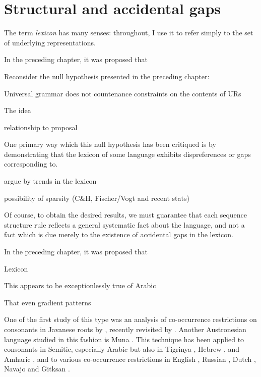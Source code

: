 \chapter{Structural and accidental gaps\protect{}}
\label{clusters}

The term \emph{lexicon} has many senses: throughout, I use it to refer simply to the set of underlying representations.

In the preceding chapter, it was proposed that 

Reconsider the null hypothesis presented in the preceding chapter:

\begin{example}
Universal grammar does not countenance constraints on the contents of URs
\end{example}

The idea 

relationship to proposal

One primary way which this null hypothesis has been critiqued is by demonstrating that the lexicon of some language 
exhibits dispreferences or gaps corresponding to.

argue by trends in the lexicon

possibility of sparsity (C\&H, Fischer/Vogt and recent stats)

Of course, to obtain the desired results, we must guarantee that each sequence structure rule reflects a general systematic fact about the language, and not a fact which is due merely to the existence of accidental gaps in the lexicon. \citep[][401, fn.~8]{Stanley1967}

In the preceding chapter, it was proposed that 

Lexicon

This appears to be exceptionlessly true of Arabic

That even gradient patterns 

One of the first study of this type was an analysis of co-occurrence restrictions on consonants in Javanese roots by \citet{Mester1988}, recently revisited by \citet{Graff2011}. 
Another Austronesian language studied in this fashion is Muna \citep{Coetzee2008a,Anttila2008}.
This technique has been applied to consonants in Semitic, especially Arabic \citep{McCarthy1988,McCarthy1994,Pierrehumbert1993,Frisch1996,Frisch2004,Coetzee2008a} but also in Tigrinya \citep{Buckley1997}, Hebrew \citep{Berent2003}, and Amharic \citep{Colavin2010}, and to various co-occurrence restrictions in English \citep{Berkley1994b,Berkley1994a,Pierrehumbert1994,Dmitrieva2008a,Dmitrieva2008b,Coetzee2008b}, Russian \citep{Padgett1992}, Dutch \citep{Graff2011}, Navajo \citep{Martin2007,Martin2011} and Gitksan \citep{Brown2010}.

